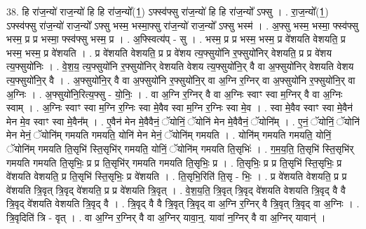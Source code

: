 \documentclass[17pt]{extarticle}
\begin{document}
38. हि रा॑ज॒न्यो॑ राज॒न्यो॑ हि हि रा॑ज॒न्यो᳚(1॒) ऽफ्स्व॑फ्सु रा॑ज॒न्यो॑ हि हि रा॑ज॒न्यो᳚ ऽफ्सु । . रा॒ज॒न्यो᳚(1॒) ऽफ्स्व॑फ्सु रा॑ज॒न्यो॑ राज॒न्यो᳚ ऽफ्सु भस्म॒ भस्मा॒फ्सु रा॑ज॒न्यो॑ राज॒न्यो᳚ ऽफ्सु भस्म॑ । . अ॒फ्सु भस्म॒ भस्मा॒ फ्स्व॑फ्सु भस्म॒ प्र प्र भस्मा॒ फ्स्व॑फ्सु भस्म॒ प्र । . अ॒फ्स्वित्य॑प् - सु । . भस्म॒ प्र प्र भस्म॒ भस्म॒ प्र वे॑शयति वेशयति॒ प्र भस्म॒ भस्म॒ प्र वे॑शयति । . प्र वे॑शयति वेशयति॒ प्र प्र वे॑शय त्य॒फ्सुयो॑नि र॒फ्सुयो॑निर् वेशयति॒ प्र प्र वे॑शय त्य॒फ्सुयो॑निः । . वे॒श॒य॒ त्य॒फ्सुयो॑नि र॒फ्सुयो॑निर् वेशयति वेशय त्य॒फ्सुयो॑नि॒र् वै वा अ॒फ्सुयो॑निर् वेशयति वेशय त्य॒फ्सुयो॑नि॒र् वै । . अ॒फ्सुयो॑नि॒र् वै वा अ॒फ्सुयो॑नि र॒फ्सुयो॑नि॒र् वा अ॒ग्नि र॒ग्निर् वा अ॒फ्सुयो॑नि र॒फ्सुयो॑नि॒र् वा अ॒ग्निः । . अ॒फ्सुयो॑नि॒रित्य॒फ्सु - यो॒निः॒ । . वा अ॒ग्नि र॒ग्निर् वै वा अ॒ग्निः स्वाꣳ स्वा म॒ग्निर् वै वा अ॒ग्निः स्वाम् । . अ॒ग्निः स्वाꣳ स्वा म॒ग्नि र॒ग्निः स्वा मे॒वैव स्वा म॒ग्नि र॒ग्निः स्वा मे॒व । . स्वा मे॒वैव स्वाꣳ स्वा मे॒वैन॑ मेन मे॒व स्वाꣳ स्वा मे॒वैन᳚म् । . ए॒वैन॑ मेन मे॒वैवैनं॒ ॅयोनिं॒ ॅयोनि॑ मेन मे॒वैवैनं॒ ॅयोनि᳚म् । . ए॒नं॒ ॅयोनिं॒ ॅयोनि॑ मेन मेनं॒ ॅयोनि॑म् गमयति गमयति॒ योनि॑ मेन मेनं॒ ॅयोनि॑म् गमयति । . योनि॑म् गमयति गमयति॒ योनिं॒ ॅयोनि॑म् गमयति ति॒सृभि॑ स्ति॒सृभि॑र् गमयति॒ योनिं॒ ॅयोनि॑म् गमयति ति॒सृभिः॑ । . ग॒म॒य॒ति॒ ति॒सृभि॑ स्ति॒सृभि॑र् गमयति गमयति ति॒सृभिः॒ प्र प्र ति॒सृभि॑र् गमयति गमयति ति॒सृभिः॒ प्र । . ति॒सृभिः॒ प्र प्र ति॒सृभि॑ स्ति॒सृभिः॒ प्र वे॑शयति वेशयति॒ प्र ति॒सृभि॑ स्ति॒सृभिः॒ प्र वे॑शयति । . ति॒सृभि॒रिति॑ ति॒सृ - भिः॒ । . प्र वे॑शयति वेशयति॒ प्र प्र वे॑शयति त्रि॒वृत् त्रि॒वृद् वे॑शयति॒ प्र प्र वे॑शयति त्रि॒वृत् । . वे॒श॒य॒ति॒ त्रि॒वृत् त्रि॒वृद् वे॑शयति वेशयति त्रि॒वृद् वै वै त्रि॒वृद् वे॑शयति वेशयति त्रि॒वृद् वै । . त्रि॒वृद् वै वै त्रि॒वृत् त्रि॒वृद् वा अ॒ग्नि र॒ग्निर् वै त्रि॒वृत् त्रि॒वृद् वा अ॒ग्निः । . त्रि॒वृदिति॑ त्रि - वृत् । . वा अ॒ग्नि र॒ग्निर् वै वा अ॒ग्निर् यावा॒न्॒. यावा॑ न॒ग्निर् वै वा अ॒ग्निर् यावान्॑ । \newline
\pagebreak
{}
\end{document}
